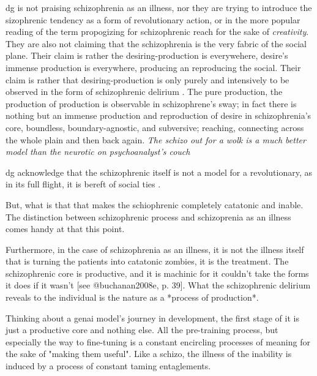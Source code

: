 \gls{dg} is not praising schizophrenia as an illness, nor they are trying to introduce the
sizophrenic tendency as a form of revolutionary action, or in the more popular
reading of the term propogizing for schizophrenic reach for the sake of
\textit{creativity}. They are also not
claiming that the schizophrenia is the very fabric of the social plane. Their
claim is rather the desiring-production is everywehere, desire's immense
production is everywhere, producing an reproducing the social. Their claim is
rather that desiring-production is only purely and intensively to be observed
in the form of schizophrenic delirium \parencite[43]{buchanan2008b}. The pure
production, the production of production is observable in schizophrene's sway;
in fact there is nothing but an immense production and reproduction of desire
in schizophrenia's core, boundless, boundary-agnostic, and subversive;
reaching, connecting across the whole plain and then back again. \textit{The
	schizo out for a wolk is a much better model than the neurotic on
	psychoanalyst's couch}

\gls{dg}  acknowledge that the schizophrenic itself is  not a model for a revolutionary, as in its full flight, it is bereft of social ties \parencite[50]{buchanan2008b}.

But, what is that that makes the schiophrenic completely catatonic and inable.
The distinction between schizophrenic process and schizoprenia as an illness
comes handy at that this point.


\begin{orangebox}
	Furthermore, in the case of schizophrenia as an illness, it is not the illness itself that is turning the patients into catatonic zombies, it is the treatment. The schizophrenic core is productive, and it is machinic for it couldn't take the forms it does if it wasn't [see @buchanan2008e, p. 39]. What the schizophrenic delirium reveals to the individual is the nature as a *process of production*.
\end{orangebox}

Thinking about a \gls{genai} model's journey in development, the first stage of
it is just a productive core and nothing else. All the pre-training process,
but especially the way to fine-tuning is a constant encircling processes of
meaning for the sake of "making them useful". Like a schizo, the illness of the
inability is induced by a process of constant taming entaglements.


